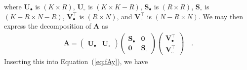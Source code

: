 \documentclass[modern]{aastex62}
\begin{document}
%
where
$\mathbf{U}_\bullet$ is $(K \times R)$,
$\mathbf{U}_\circ$ is $(K \times K - R)$,
$\mathbf{S}_\bullet$ is $(R \times R)$,
$\mathbf{S}_\circ$ is $(K - R \times N - R)$,
$\mathbf{V}_\bullet^\top$ is $(R \times N)$,
and
$\mathbf{V}_\circ^\top$ is $(N - R \times N)$.
%
We may then express the decomposition of $\mathbf{A}$ as
%
\begin{align}
    \label{eq:A}
    \mathbf{A} =
    \left(
    \begin{array}{c|c}
            \mathbf{U}_\bullet & \mathbf{U}_\circ
        \end{array}
    \right)
    \left(
    \begin{array}{c|c}
            \mathbf{S}_\bullet & \mathbf{0}       \\
            \hline
            \mathbf{0}         & \mathbf{S}_\circ
        \end{array}
    \right)
    \left(
    \begin{array}{cc}
            \mathbf{V}_\bullet^\top \\
            \hline
            \mathbf{V}_\circ^\top
        \end{array}
    \right)
    \quad.
\end{align}
%
Inserting this into Equation~(\ref{eq:fAy}), we have
%
\end{document}
